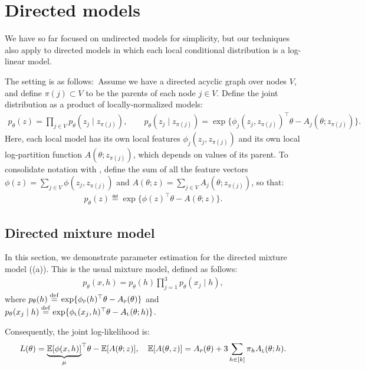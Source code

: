 \appendix

\section{Directed models}
\label{sec:directedModels}

We have so far focused on undirected models for simplicity,
but our techniques also apply to directed models in which each
local conditional distribution is a log-linear model.

The setting is as follows:~Assume we have a directed acyclic graph over
nodes $V$,
and define $\pi(j) \subset V$ to be the parents of each node $j \in V$.
Define the joint distribution as a product of locally-normalized models:
\begin{align}
  p_\theta(z) = \prod_{j \in V} p_\theta(z_j \mid z_{\pi(j)}), \quad\quad
  p_\theta(z_j \mid z_{\pi(j)}) = \exp \{ \phi_j(z_j, z_{\pi(j)})^\top\theta - A_j(\theta; z_{\pi(j)}) \}.
\end{align}
Here, each local model has its own local features $\phi_j(z_j, z_{\pi(j)})$
and its own local log-partition function $A(\theta; z_{\pi(j)})$, which depends on values of its parent.
To consolidate notation with ,
define the sum of all the feature vectors
$\phi(z) = \sum_{j \in V} \phi(z_j, z_{\pi(j)})$
and $A(\theta; z) = \sum_{j \in V} A_j(\theta; z_{\pi(j)})$,
so that:
\begin{align}
  p_\theta(z) \eqdef \exp\{ \phi(z)^\top\theta - A(\theta; z) \}.
\end{align}

\subsection{Directed mixture model}

In this section, we demonstrate parameter estimation for the directed mixture
model ((a)).  This is the usual mixture model, defined
as follows:
\begin{align}
p_\theta(x,h) = p_\theta(h) \prod_{j=1}^3 p_\theta(x_j \mid h),
\end{align}
where
$p_\theta(h) \stackrel{\rm def}{=} \exp\{\phi_\text{\sc p}(h)^\top\theta - A_\text{\sc p}(\theta)\}$
and
$p_\theta(x_j \mid h) \stackrel{\rm def}{=} \exp\{\phi_\text{\sc l}(x_j, h)^\top\theta - A_\text{\sc l}(\theta; h)\}$.

Consequently, the joint log-likelihood is:
\begin{align}
  L(\theta) = {\underbrace{\mathbb{E}[\phi(x,h)]}_{\mu}}^\top\theta - \mathbb{E}[A(\theta; z)], \quad
  \mathbb{E}[A(\theta, z)] = A_\text{\sc p}(\theta) + 3 \sum_{h \in [k]} \pi_h A_\text{\sc l}(\theta;h).
\end{align}

